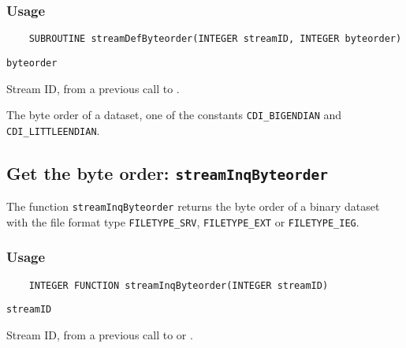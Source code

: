 \subsubsection*{Usage}

\begin{verbatim}
    SUBROUTINE streamDefByteorder(INTEGER streamID, INTEGER byteorder)
\end{verbatim}

\hspace*{4mm}\begin{minipage}[]{15cm}
\begin{deflist}{\tt byteorder\ }
\item[{\tt streamID}]
Stream ID, from a previous call to {}.
\item[{\tt byteorder}]
The byte order of a dataset, one of the {\CDI} constants {\tt CDI\_BIGENDIAN} and
                     {\tt CDI\_LITTLEENDIAN}.

\end{deflist}
\end{minipage}


\subsection{Get the byte order: {\tt streamInqByteorder}}
\label{streamInqByteorder}

The function {\tt streamInqByteorder} returns the byte order of a binary dataset
with the file format type {\tt FILETYPE\_SRV}, {\tt FILETYPE\_EXT} or {\tt FILETYPE\_IEG}.

\subsubsection*{Usage}

\begin{verbatim}
    INTEGER FUNCTION streamInqByteorder(INTEGER streamID)
\end{verbatim}

\hspace*{4mm}\begin{minipage}[]{15cm}
\begin{deflist}{\tt streamID\ }
\item[{\tt streamID}]
Stream ID, from a previous call to {} or {}.

\end{deflist}
\end{minipage}

